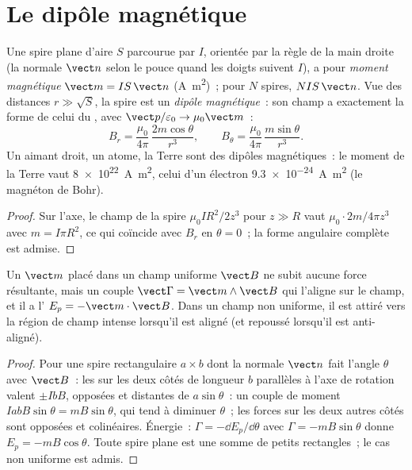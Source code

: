 \section{Le dipôle magnétique}

\begin{definition}\label{def:b1:magnetostatics:moment}
Une spire plane d'aire $S$ parcourue par $I$, orientée par la règle de la main
droite (la normale $\vect n$ selon le pouce quand les doigts suivent $I$), a
pour \emph{moment magnétique} $\vect m = IS\,\vect n$ (\unit{A.m^2})~; pour $N$
spires, $NIS\,\vect n$. Vue des distances $r \gg \sqrt S$, la spire est un
\emph{dipôle magnétique}~: son champ a exactement la forme de celui du , avec $\vect p/\varepsilon_0 \to \mu_0\vect m$~:
\[
B_r = \frac{\mu_0}{4\pi}\,\frac{2m\cos\theta}{r^3}, \qquad
B_\theta = \frac{\mu_0}{4\pi}\,\frac{m\sin\theta}{r^3} .
\]
Un aimant droit, un atome, la Terre sont des dipôles magnétiques~: le moment
de la Terre vaut \qty{8e22}{A.m^2}, celui d'un électron \qty{9.3e-24}{A.m^2}
(le magnéton de Bohr).
\end{definition}

\begin{proof}
Sur l'axe, le champ de la spire $\mu_0IR^2/2z^3$ pour $z \gg R$ vaut
$\mu_0 \cdot 2m/4\pi z^3$ avec $m = I\pi R^2$, ce qui coïncide avec $B_r$ en $\theta = 0$~;
la forme angulaire complète est admise.
\end{proof}

\begin{theorem}\label{thm:b1:magnetostatics:dipoleinfield}
Un  $\vect m$ placé dans un champ uniforme $\vect B$ ne subit
aucune force résultante, mais un couple $\vect\Gamma = \vect m\wedge\vect B$
qui l'aligne sur le champ, et il a l' $E_p = -\vect m\cdot\vect B$.
Dans un champ non uniforme, il est attiré vers la région de champ intense
lorsqu'il est aligné (et repoussé lorsqu'il est anti-aligné).
\end{theorem}

\begin{proof}
Pour une spire rectangulaire $a \times b$ dont la normale $\vect n$ fait
l'angle $\theta$ avec $\vect B$~: les  sur les deux côtés de
longueur $b$ parallèles à l'axe de rotation valent $\pm IbB$, opposées et
distantes de $a\sin\theta$~: un couple de moment $IabB\sin\theta = mB\sin\theta$,
qui tend à diminuer $\theta$~; les forces sur les deux autres côtés sont
opposées et colinéaires. Énergie~: $\Gamma = -\dd E_p/\dd\theta$ avec $\Gamma = -mB\sin\theta$
donne $E_p = -mB\cos\theta$. Toute spire plane est une somme de petits
rectangles~; le cas non uniforme est admis.
\end{proof}

